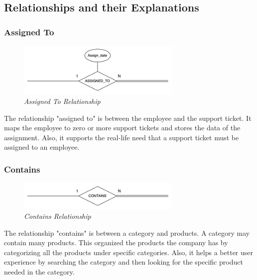 \documentclass[11pt]{article}
\begin{document}
\subsection{Relationships and their Explanations}

\subsubsection{Assigned To}
\begin{figure}[H]
  \centering
  \includegraphics[width=0.7\textwidth]{images/relationships/assigned_to.png}
  \caption{\textit{Assigned To Relationship}}
\end{figure}

The relationship "assigned to" is between the employee and the support ticket. It maps the employee to zero or more support tickets and stores the data of the assignment. Also, it supports the real-life need that a support ticket must be assigned to an employee.

\subsubsection{Contains}
\begin{figure}[H]
  \centering
  \includegraphics[width=0.7\textwidth]{images/relationships/contains.png}
  \caption{\textit{Contains Relationship}}
\end{figure}

The relationship "contains" is between a category and products. A category may contain many products. This organized the products the company has by categorizing all the products under specific categories. Also, it helps a better user experience by searching the category and then looking for the specific product needed in the category.
\end{document}
